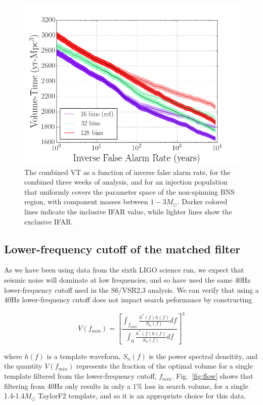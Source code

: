 \begin{figure}
\centering
\includegraphics[width=1.0\textwidth]{papers/bns_o1_dev/figures/chisq_combined.png}
\caption{\label{fig:fchisq} 
The combined VT as a function of inverse false alarm rate, for the combined three weeks of analysis, and for an injection population that uniformly covers the parameter space of the non-spinning BNS region, with component masses between $1- 3M_\odot$. Darker colored lines indicate the inclusive IFAR value, while lighter lines show the exclusive IFAR. 
}
\end{figure}

\subsection{Lower-frequency cutoff of the matched filter}

As we have been using data from the sixth LIGO science run, we expect that seismic noise will dominate at low frequencies, and so have used the same 40Hz lower-frequency cutoff used in the S6/VSR2,3 analysis. We can verify that using a 40Hz lower-frequency cutoff does not impact search peformance by constructing

\begin{equation}
V(f_{min}) = \left[ \frac{\int_{f_{min}} \frac{h^{*}(f)h(f)}{S_n(f)} df}{\int_{0} \frac{h^*(f)h(f)}{S_n(f)} df} \right]^3
\end{equation}

where $h(f)$ is a template waveform, $S_n(f)$ is the power spectral densitity, and the quantity $V(f_{min})$ represents the fraction of the optimal volume for a single template
filtered from the lower-frequency cutoff, $f_{min}$. Fig.~\ref{fig:flow} shows that filtering from 40Hz only results in only a $1\%$ loss in search volume, for a single 1.4-1.4$M_\odot$ TaylorF2 template, and so it is an appropriate choice for this data.

